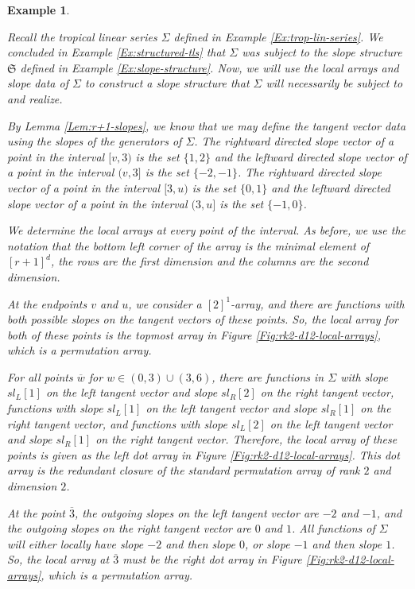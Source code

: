 \documentclass{amsart}
\newtheorem{varexample}[theorem]{Example}
\newenvironment{example}{\begin{varexample}
		\begin{normalfont}}{\end{normalfont}
\end{varexample}}
\begin{document}
	\begin{example}
		Recall the tropical linear series $\Sigma$ defined in Example \ref{Ex:trop-lin-series}. We concluded in Example \ref{Ex:structured-tls} that $\Sigma$ was subject to the slope structure $\mathfrak{S}$ defined in Example \ref{Ex:slope-structure}. Now, we will use the local arrays and slope data of $\Sigma$ to construct a slope structure that $\Sigma$ will necessarily be subject to and realize.
		
		By Lemma \ref{Lem:r+1-slopes}, we know that we may define the tangent vector data using the slopes of the generators of $\Sigma$. The rightward directed slope vector of a point in the interval $[v,3)$ is the set $\{ 1,2 \}$ and the leftward directed slope vector of a point in the interval $(v,3]$ is the set $\{ -2, -1 \}$. The rightward directed slope vector of a point in the interval $[3,u)$ is the set $\{ 0,1 \}$ and the leftward directed slope vector of a point in the interval $(3,u]$ is the set $\{ -1, 0 \}$. 
		
		We determine the local arrays at every point of the interval. As before, we use the notation that the bottom left corner of the array is the minimal element of $[r+1]^d$, the rows are the first dimension and the columns are the second dimension.
		
		At the endpoints $v$ and $u$, we consider a $[2]^1$-array, and there are functions with both possible slopes on the tangent vectors of these points. So, the local array for both of these points is the topmost array in Figure \ref{Fig:rk2-d12-local-arrays}, which is a permutation array.
		
		For all points $\overline{w}$ for $w \in (0,3) \cup (3,6)$, there are functions in $\Sigma$ with slope $sl_L[1]$ on the left tangent vector and slope $sl_R[2]$ on the right tangent vector, functions with slope $sl_L[1]$ on the left tangent vector and slope $sl_R[1]$ on the right tangent vector, and functions with slope $sl_L[2]$ on the left tangent vector and slope $sl_R[1]$ on the right tangent vector. Therefore, the local array of these points is given as the left dot array in Figure \ref{Fig:rk2-d12-local-arrays}. This dot array is the redundant closure of the standard permutation array of rank $2$ and dimension $2$.
		
		At the point $\overline{3}$, the outgoing slopes on the left tangent vector are $-2$ and $-1$, and the outgoing slopes on the right tangent vector are $0$ and $1$. All functions of $\Sigma$ will either locally have slope $-2$ and then slope $0$, or slope $-1$ and then slope $1$. So, the local array at $\overline{3}$ must be the right dot array in Figure \ref{Fig:rk2-d12-local-arrays}, which is a permutation array.
	\end{example}
	
\end{document}
